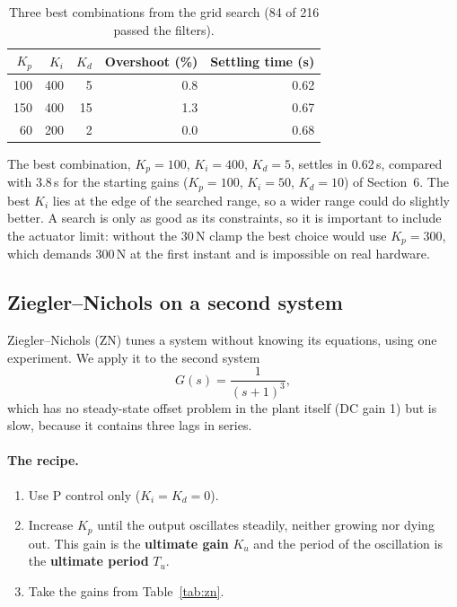 \documentclass[]{article}
\begin{document}
\begin{table}[h]
	\centering
	\begin{tabular}{@{}rrrrr@{}}
		\toprule
		$K_p$ & $K_i$ & $K_d$ & Overshoot (\%) & Settling time (s) \\
		\midrule
		100 & 400 & 5  & 0.8 & 0.62 \\
		150 & 400 & 15 & 1.3 & 0.67 \\
		60  & 200 & 2  & 0.0 & 0.68 \\
		\bottomrule
	\end{tabular}
	\caption{Three best combinations from the grid search (84 of 216 passed the filters).}
\end{table}

The best combination, $K_p=100$, $K_i=400$, $K_d=5$, settles in 0.62\,s, compared with 3.8\,s for the starting gains ($K_p=100$, $K_i=50$, $K_d=10$) of Section~6. The best $K_i$ lies at the edge of the searched range, so a wider range could do slightly better. A search is only as good as its constraints, so it is important to include the actuator limit: without the 30\,N clamp the best choice would use $K_p = 300$, which demands 300\,N at the first instant and is impossible on real hardware.

\subsection{Ziegler--Nichols on a second system}

Ziegler--Nichols (ZN) tunes a system without knowing its equations, using one experiment. We apply it to the second system
\begin{equation}
	G(s) = \frac{1}{(s+1)^3},
\end{equation}
which has no steady-state offset problem in the plant itself (DC gain 1) but is slow, because it contains three lags in series.

\paragraph{The recipe.}
\begin{enumerate}
	\item Use P control only ($K_i = K_d = 0$).
	\item Increase $K_p$ until the output oscillates steadily, neither growing nor dying out. This gain is the \textbf{ultimate gain} $K_u$ and the period of the oscillation is the \textbf{ultimate period} $T_u$.
	\item Take the gains from Table~\ref{tab:zn}.
\end{enumerate}
\end{document}
